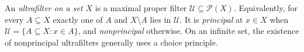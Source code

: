 
An \emph{ultrafilter on a set $X$} is a maximal proper filter $\mathcal U\subseteq\mathcal P(X)$. Equivalently, for every $A\subseteq X$ exactly one of $A$ and $X\setminus A$ lies in $\mathcal U$. It is \emph{principal} at $x\in X$ when $\mathcal U=\{A\subseteq X:x\in A\}$, and \emph{nonprincipal} otherwise. On an infinite set, the existence of nonprincipal ultrafilters generally uses a choice principle.
